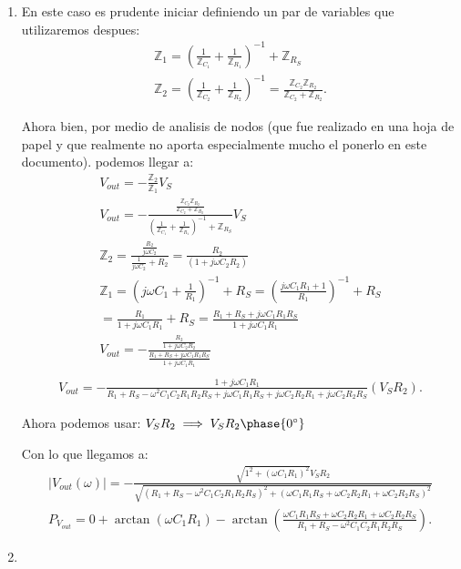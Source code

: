 \documentclass[12pt]{exam}
\begin{document}
\begin{enumerate}
  \item En este caso es prudente iniciar definiendo un par de variables que utilizaremos despues:
    \begin{align*}
      \mathbb{Z}_1 = \left( \frac{1}{\mathbb{Z}_{C_1}} + \frac{1}{\mathbb{Z}_{R_1}} \right)^{-1} + \mathbb{Z}_{R_S} \\
      \mathbb{Z}_2 = \left( \frac{1}{\mathbb{Z}_{C_2}} + \frac{1}{\mathbb{Z}_{R_2}} \right)^{-1} = \frac{\mathbb{Z}_{C_2}\mathbb{Z}_{R_2}}{\mathbb{Z}_{C_2} + \mathbb{Z}_{R_2}}
    .\end{align*}

    Ahora bien, por medio de analisis de nodos (que fue realizado en una hoja de papel y que realmente no aporta especialmente mucho el ponerlo en este documento). podemos llegar a:
    \begin{align*}
      V_{out} = - \frac{\mathbb{Z}_2}{\mathbb{Z}_1}V_S\\
      V_{out} = - \frac{\frac{\mathbb{Z}_{C_2}\mathbb{Z}_{R_2}}{\mathbb{Z}_{C_2} + \mathbb{Z}_{R_2}}}{\left( \frac{1}{\mathbb{Z}_{C_1}} + \frac{1}{\mathbb{Z}_{R_1}} \right)^{-1} + \mathbb{Z}_{R_S}}V_S\\
      \mathbb{Z}_2 = \frac{\frac{R_2}{j\omega C_2}}{\frac{1}{j\omega C_2}+ R_2} = \frac{R_2}{\left( 1 + j\omega C_2 R_2 \right) }\\
      \mathbb{Z}_1 = \left( j\omega C_1 + \frac{1}{R_1} \right)^{-1} + R_S = \left( \frac{j\omega C_1 R_1 + 1}{R_1} \right)^{-1} + R_S\\
      = \frac{R_1}{1 + j\omega C_1R_1} + R_S = \frac{R_1 + R_S + j\omega C_1R_1R_S}{1 + j\omega C_1R_1}\\
      V_{out} = - \frac{\frac{R_2}{1 + j\omega C_2R_2}}{\frac{R_1 + R_S + j \omega C_1R_1R_S}{1+j\omega C_1R_1}}\\
    \end{align*}
    \begin{align*}
      V_{out} = - \frac{1 + j \omega C_1R_1}{R_1+R_S - \omega^2 C_1C_2R_1R_2R_S + j\omega C_1R_1R_S + j\omega C_2R_2R_1 + j\omega C_2R_2R_S}\left( V_SR_2 \right) 
    .\end{align*}

    Ahora podemos usar: $V_SR_{2} \implies V_SR_2\phase{0^{\circ}}$

    Con lo que llegamos a:
    \begin{align*}
      \left|V_{out}\left( \omega \right) \right| = - \frac{\sqrt{1^2 + \left( \omega C_1 R_1 \right)^2 } V_SR_2 }{\sqrt{\left( R_1 + R_S - \omega^2C_1C_2R_1R_2R_S \right)^2+\left( \omega C_1R_1R_S + \omega C_2R_2R_1 + \omega C_2R_2R_S \right)^2  } }\\
      P_{V_{out}} = 0 + \arctan\left( \omega C_1 R_1 \right) - \arctan\left( \frac{\omega C_1R_1R_S + \omega C_2R_2 R_1 + \omega C_2R_2R_S}{R_1+R_S-\omega^2C_1C_2R_1R_2R_S} \right) 
    .\end{align*}
    \item


\end{enumerate}
\end{document}
